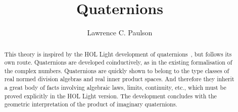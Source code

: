 \documentclass[11pt,a4paper]{article}
\begin{document}
\title{Quaternions}
\author{Lawrence C. Paulson}
\maketitle

\begin{abstract}
This theory is inspired by the HOL Light development of quaternions~\cite{gabrielli-quaternions}, but follows its own route. Quaternions are developed coinductively, as in the existing formalisation of the complex numbers. Quaternions are quickly shown to belong to the type classes of real normed division algebras and real inner product spaces. And therefore they inherit a great body of facts involving algebraic laws, limits, continuity, etc., which must be proved explicitly in the HOL Light version. The development concludes with the geometric interpretation of the product of imaginary quaternions.


\end{abstract}

\tableofcontents





\end{document}
